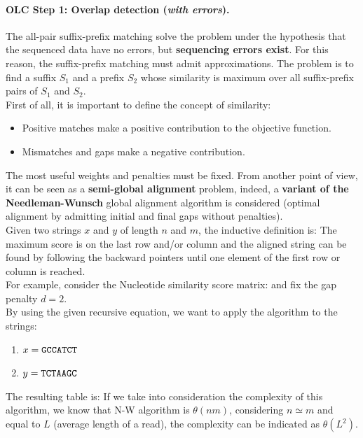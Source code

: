\paragraph*{OLC Step 1: Overlap detection (\textit{with errors}).} The all-pair suffix-prefix matching solve the problem under the hypothesis that the sequenced data have no errors, but \textbf{sequencing errors exist}. For this reason, the suffix-prefix matching must admit approximations. The problem is to find a suffix $S_1$ and a prefix $S_2$ whose similarity is maximum over all suffix-prefix pairs of $S_1$ and $S_2$.\\
First of all, it is important to define the concept of similarity:
\begin{itemize}
	\item Positive matches make a positive contribution to the objective function.
	\item Mismatches and gaps make a negative contribution.
\end{itemize}
The most useful weights and penalties must be fixed. From another point of view, it can be seen as a \textbf{semi-global alignment} problem, indeed, a \textbf{variant of the Needleman-Wunsch} global alignment algorithm is considered (optimal alignment by admitting initial and final gaps without penalties).\\
Given two strings $x$ and $y$ of length $n$ and $m$, the inductive definition is:
The maximum score is on the last row and/or column and the aligned string can be found by following the backward pointers until one element of the first row or column is reached.\\
For example, consider the Nucleotide similarity score matrix:
and fix the gap penalty $d=2$.\\
By using the given recursive equation, we want to apply the algorithm to the strings:
\begin{enumerate}
	\item $x = \verb|GCCATCT|$
	\item $y = \verb|TCTAAGC|$
\end{enumerate}
The resulting table is:
If we take into consideration the complexity of this algorithm, we know that N-W algorithm is $\theta(nm)$, considering $n \simeq m$ and equal to $L$ (average length of a read), the complexity can be indicated as $\theta(L^2)$.\\
